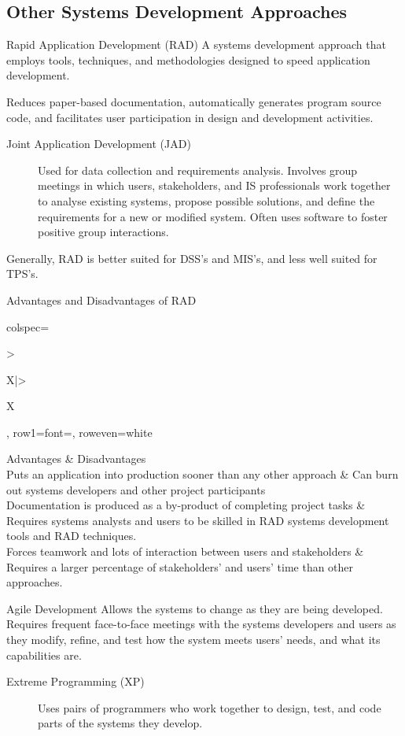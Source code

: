 \documentclass[\main/notes.tex]{subfiles}
\begin{document}
			\subsection{Other Systems Development Approaches}
				\begin{definition}{Rapid Application Development (RAD)}
					A systems development approach that employs tools, techniques, and methodologies designed to speed application development.

					Reduces paper-based documentation, automatically generates program source code, and facilitates user participation in design and development activities.
					\begin{description}
						\item[Joint Application Development (JAD)] Used for data collection and requirements analysis. Involves group meetings in which users, stakeholders, and IS professionals work together to analyse existing systems, propose possible solutions, and define the requirements for a new or modified system. Often uses  software to foster positive group interactions.
					\end{description}
					Generally, RAD is better suited for DSS's and MIS's, and less well suited for TPS's.
				\end{definition}
				\pagebreak
				\begin{sidenote}{Advantages and Disadvantages of RAD}
					\begin{center}
						\begin{tblr}{colspec={>{\raggedright}X|>{\raggedright}X}, row{1}={font=\bfseries}, row{even}={white}}
							Advantages & Disadvantages\\
							\midrule
							Puts an application into production sooner than any other approach & Can burn out systems developers and other project participants\\
							Documentation is produced as a by-product of completing project tasks & Requires systems analysts and users to be skilled in RAD systems development tools and RAD techniques.\\
							Forces teamwork and lots of interaction between users and stakeholders & Requires a larger percentage of stakeholders' and users' time than other approaches.
						\end{tblr}
					\end{center}
				\end{sidenote}
				\begin{definition}{Agile Development}
					Allows the systems to change as they are being developed. Requires frequent face-to-face meetings with the systems developers and users as they modify, refine, and test how the system meets users' needs, and what its capabilities are.
					\begin{description}
						\item[Extreme Programming (XP)] Uses pairs of programmers who work together to design, test, and code parts of the systems they develop.
					\end{description}
				\end{definition}
\end{document}
